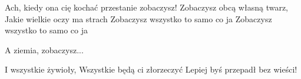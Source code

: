 \documentclass[../../../songbook.tex]{subfiles}
\begin{document}
Ach, kiedy ona cię kochać przestanie zobaczysz!	 \newline
Zobaczysz obcą własną twarz,	 \newline
Jakie wielkie oczy ma strach	 \newline
Zobaczysz wszystko to samo co ja	 \newline
Zobaczysz wszystko to samo co ja	 \newline

\-\hspace{1cm} A ziemia, zobaczysz...	 \newline

I wszystkie żywioły, 			 \newline
Wszystkie będą ci złorzeczyć 	 \newline
Lepiej byś przepadł bez wieści!  \newline
\end{document}
